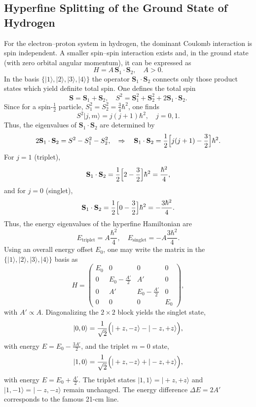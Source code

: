 \documentclass[twocolumn]{article}
\begin{document}
\begin{spacing}{1}
\subsection{Hyperfine Splitting of the Ground State of Hydrogen}
For the electron–proton system in hydrogen, the dominant Coulomb interaction is spin independent. A smaller spin–spin interaction exists and, in the ground state (with zero orbital angular momentum), it can be expressed as
\[
H=A\,\mathbf{S}_1\cdot\mathbf{S}_2,\quad A>0.
\]
In the basis \(\{|1\rangle,|2\rangle,|3\rangle,|4\rangle\}\) the operator \( \mathbf{S}_1\cdot\mathbf{S}_2 \) connects only those product states which yield definite total spin. One defines the total spin
\[
\mathbf{S}=\mathbf{S}_1+\mathbf{S}_2,\quad S^2=\mathbf{S}_1^2+\mathbf{S}_2^2+2\mathbf{S}_1\cdot\mathbf{S}_2.
\]
Since for a spin-\(\frac{1}{2}\) particle, \(S_1^2=S_2^2=\frac{3}{4}\hbar^2\), one finds
\[
S^2|j,m\rangle=j(j+1)\hbar^2,\quad j=0,1.
\]
Thus, the eigenvalues of \( \mathbf{S}_1\cdot\mathbf{S}_2 \) are determined by
\[
2\mathbf{S}_1\cdot\mathbf{S}_2=S^2-S_1^2-S_2^2,\quad \Rightarrow\quad \mathbf{S}_1\cdot\mathbf{S}_2 = \frac{1}{2}\Bigl[j(j+1)-\frac{3}{2}\Bigr]\hbar^2.
\]
For \(j=1\) (triplet),
\[
\mathbf{S}_1\cdot\mathbf{S}_2=\frac{1}{2}\Bigl[2-\frac{3}{2}\Bigr]\hbar^2=\frac{\hbar^2}{4},
\]
and for \(j=0\) (singlet),
\[
\mathbf{S}_1\cdot\mathbf{S}_2=\frac{1}{2}\Bigl[0-\frac{3}{2}\Bigr]\hbar^2=-\frac{3\hbar^2}{4}.
\]
Thus, the energy eigenvalues of the hyperfine Hamiltonian are
\[
E_{\text{triplet}}=A\frac{\hbar^2}{4},\quad E_{\text{singlet}}=-A\frac{3\hbar^2}{4}.
\]
Using an overall energy offset \(E_0\), one may write the matrix in the \(\{|1\rangle,|2\rangle,|3\rangle,|4\rangle\}\) basis as
\[
H=\begin{pmatrix}
E_0 & 0 & 0 & 0\\[1mm]
0 & E_0-\frac{A'}{2} & A' & 0\\[1mm]
0 & A' & E_0-\frac{A'}{2} & 0\\[1mm]
0 & 0 & 0 & E_0
\end{pmatrix},
\]
with \(A'\propto A\). Diagonalizing the \(2\times2\) block yields the singlet state,
\[
|0,0\rangle=\frac{1}{\sqrt{2}}\Bigl(|+z,-z\rangle-| -z,+z\rangle\Bigr),
\]
with energy \(E=E_0- \frac{3A'}{2}\), and the triplet \(m=0\) state,
\[
|1,0\rangle=\frac{1}{\sqrt{2}}\Bigl(|+z,-z\rangle+| -z,+z\rangle\Bigr),
\]
with energy \(E=E_0+\frac{A'}{2}\). The triplet states \(|1,1\rangle=|+z,+z\rangle\) and \(|1,-1\rangle=|-z,-z\rangle\) remain unchanged. The energy difference \(\Delta E=2A'\) corresponds to the famous 21-cm line.


\end{spacing}
\end{document}
